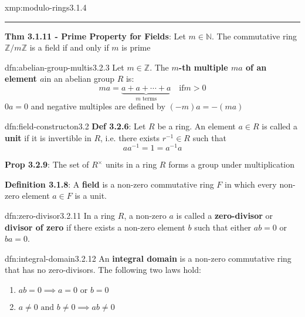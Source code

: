 \documentclass[landscape, 8pt]{extarticle}
\begin{document}
\begin{multicols}{3}
\begin{xmp}{xmp:modulo-rings}{3.1.4}
    \vspace{-8pt}
    \noindent\rule{\textwidth}{0.2pt}
    \textbf{Thm 3.1.11 - Prime Property for Fields}: Let $m\in\mathbb{N}$. The commutative ring $\mathbb{Z} / m\mathbb{Z}$ is a field if and only if $m$ is prime
\end{xmp}

\vspace{-6pt}
\begin{dfn}{dfn:abelian-group-multis}{3.2.3}
    \vspace{-5pt}
    Let $m\in \mathbb{Z}$. The \textbf{$m$-th multiple $ma$ of an element $a$}in an abelian group $R$ is:
    \[ma = \underbrace{a + a + \cdots + a}_{\text{$m$ terms}} \quad \text{if} m > 0\]
    $0a = 0$ and negative multiples are defined by $(-m)a = -(ma)$
\end{dfn}

\vspace{-5pt}
\begin{dfn}{dfn:field-constructon}{3.2}
    \vspace{-5pt}
    \textbf{Def 3.2.6}: Let $R$ be a ring. An element $a\in R$ is called a \textbf{unit} if it is invertible in $R$, i.e. there exists $r^{-1}\in R$ such that
    \[a a^{-1} = 1 = a^{-1}a\]

    \textbf{Prop 3.2.9}: The set of $R^{\times}$ units in a ring $R$ forms a group under multiplication

    \textbf{Definition 3.1.8}: A \textbf{field} is a non-zero commutative ring $F$ in which every non-zero element $a\in F$ is a unit.
\end{dfn}

\vspace{-5pt}
\begin{dfn}{dfn:zero-divisor}{3.2.11}
    \vspace{-5pt}
    In a ring $R$, a non-zero $a$ is called a \textbf{zero-divisor} or \textbf{divisor of zero} if there exists a non-zero element $b$ such that either $ab = 0$ or $ba = 0$.
\end{dfn}

\vspace{-10pt}
\begin{multicols}{2}
    \begin{sdfn}{dfn:integral-domain}{3.2.12}
        \vspace{-5pt}
        An \textbf{integral domain} is a non-zero commutative ring that has no zero-divisors. The following two laws hold:
        \begin{enumerate}
            \setlength\itemsep{0em}
            \item $ab = 0 \implies a = 0 \text{ or } b = 0$
            \item $a \ne 0 \text{ and } b \ne 0 \implies ab \ne 0$
        \end{enumerate}



\end{sdfn}
\end{multicols}
\end{multicols}
\end{document}
